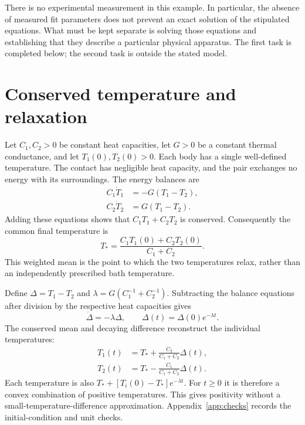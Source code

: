 \documentclass[aps,prx,reprint,groupedaddress]{revtex4-2}
\begin{document}
There is no experimental measurement in this example. In particular, the absence of measured fit parameters does not prevent an exact solution of the stipulated equations. What must be kept separate is solving those equations and establishing that they describe a particular physical apparatus. The first task is completed below; the second task is outside the stated model.

\section{Conserved temperature and relaxation}
Let $C_1,C_2>0$ be constant heat capacities, let $G>0$ be a constant thermal conductance, and let $T_1(0),T_2(0)>0$. Each body has a single well-defined temperature. The contact has negligible heat capacity, and the pair exchanges no energy with its surroundings. The energy balances are
\begin{align}
 C_1\dot T_1&=-G(T_1-T_2),\label{eq:balance1}\\
 C_2\dot T_2&= G(T_1-T_2).\label{eq:balance2}
\end{align}
Adding these equations shows that $C_1T_1+C_2T_2$ is conserved. Consequently the common final temperature is
\begin{equation}
 T_* = \frac{C_1T_1(0)+C_2T_2(0)}{C_1+C_2}.\label{eq:tstar}
\end{equation}
This weighted mean is the point to which the two temperatures relax, rather than an independently prescribed bath temperature.

Define $\Delta=T_1-T_2$ and $\lambda=G(C_1^{-1}+C_2^{-1})$. Subtracting the balance equations after division by the respective heat capacities gives
\begin{equation}
 \dot\Delta=-\lambda\Delta,\qquad
 \Delta(t)=\Delta(0)e^{-\lambda t}.\label{eq:delta}
\end{equation}
The conserved mean and decaying difference reconstruct the individual temperatures:
\begin{align}
 T_1(t)&=T_*+\frac{C_2}{C_1+C_2}\Delta(t),\label{eq:t1}\\
 T_2(t)&=T_*-\frac{C_1}{C_1+C_2}\Delta(t).\label{eq:t2}
\end{align}
Each temperature is also $T_*+[T_i(0)-T_*]e^{-\lambda t}$. For $t\geq0$ it is therefore a convex combination of positive temperatures. This gives positivity without a small-temperature-difference approximation. Appendix~\ref{app:checks} records the initial-condition and unit checks.
\end{document}
